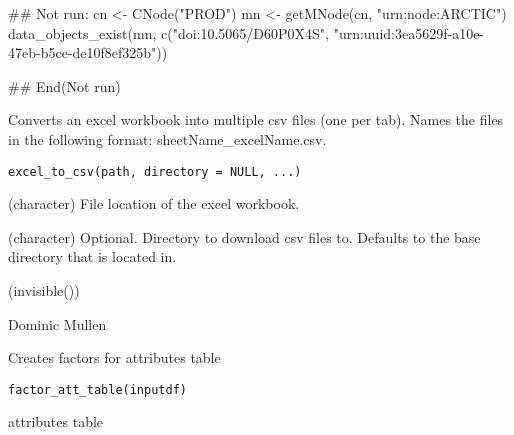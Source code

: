 \documentclass[letterpaper]{book}
\begin{document}
%
\begin{Examples}
\begin{ExampleCode}
## Not run: 
cn <- CNode("PROD")
mn <- getMNode(cn, "urn:node:ARCTIC")
data_objects_exist(mn,
c("doi:10.5065/D60P0X4S", "urn:uuid:3ea5629f-a10e-47eb-b5ce-de10f8ef325b"))

## End(Not run)

\end{ExampleCode}
\end{Examples}
%
\begin{Description}\relax
Converts an excel workbook into multiple csv files (one per tab).  Names the
files in the following format: sheetName\_excelName.csv.
\end{Description}
%
\begin{Usage}
\begin{verbatim}
excel_to_csv(path, directory = NULL, ...)
\end{verbatim}
\end{Usage}
%
\begin{Arguments}
\begin{ldescription}
\item[\code{path}] (character) File location of the excel workbook.

\item[\code{directory}] (character) Optional.  Directory to download csv files to.
Defaults to the base directory that  is located in.
\end{ldescription}
\end{Arguments}
%
\begin{Value}
(invisible())
\end{Value}
%
\begin{Author}\relax
Dominic Mullen 
\end{Author}
%
\begin{Description}\relax
Creates factors for attributes table
\end{Description}
%
\begin{Usage}
\begin{verbatim}
factor_att_table(inputdf)
\end{verbatim}
\end{Usage}
%
\begin{Arguments}
\begin{ldescription}
\item[\code{inputdf}] attributes table
\end{ldescription}
\end{Arguments}
\end{document}
